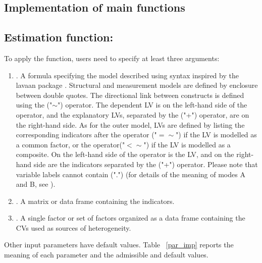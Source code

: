 \subsection{Implementation of main functions}

\subsection{Estimation function: }

To apply the  function, users need to specify at least three arguments: 

\begin{enumerate}
\item  {}. A formula specifying the model described using syntax inspired by the lavaan package \citep{lavaan}. Structural and measurement models are defined by enclosure between double quotes. The directional link between constructs is defined using the ("$\sim$") operator. The dependent LV is on the left-hand side of the operator, and the explanatory LVs, separated by the ("+") operator, are on the right-hand side. As for the outer model, LVs are defined by listing the corresponding indicators after the operator ("$=\sim$") if the LV is modelled as a common factor, or the operator("$<\sim$") if the LV is modelled as a composite. On the left-hand side of the operator is the LV, and on the right-hand side are the indicators separated by the ("+") operator. Please note that variable labels cannot contain (".") (for details of the meaning of modes A and B, see \citealp{Hair16}).
\item  {}. A matrix or data frame containing the indicators. 
\item  {}. A single factor or set of factors organized as a data frame containing the CVs used as sources of heterogeneity.
\end{enumerate}

Other input parameters have default values.  Table ~\ref{par_imp} reports the meaning of each parameter and the admissible and default values. 

